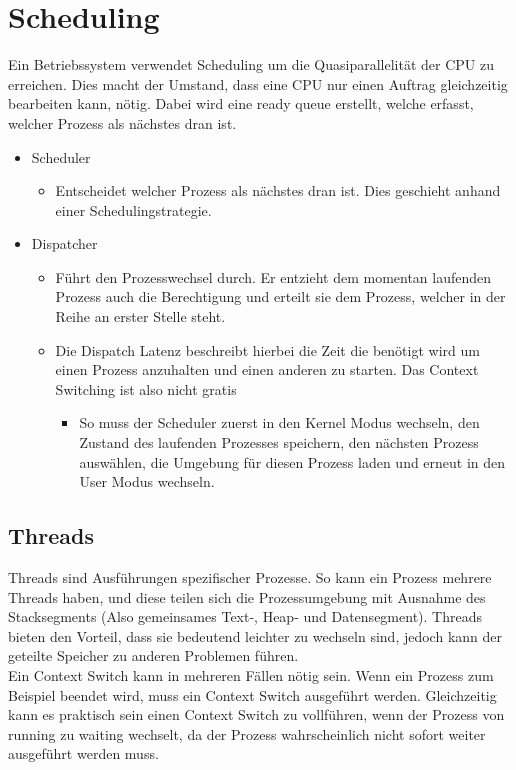 \documentclass{article}
\begin{document}
	\section{Scheduling}
	Ein Betriebssystem verwendet Scheduling um die Quasiparallelität der CPU zu erreichen. Dies macht der Umstand, dass eine CPU nur einen Auftrag gleichzeitig bearbeiten kann, nötig. Dabei wird eine ready queue erstellt, welche erfasst, welcher Prozess als nächstes dran ist. \\
	\begin{itemize}
		\item{Scheduler}
		\begin{itemize}
			\item{Entscheidet welcher Prozess als nächstes dran ist. Dies geschieht anhand einer Schedulingstrategie.}
		\end{itemize}
		\item{Dispatcher}
		\begin{itemize}
			\item{Führt den Prozesswechsel durch. Er entzieht dem momentan laufenden Prozess auch die Berechtigung und erteilt sie dem Prozess, welcher in der Reihe an erster Stelle steht.}
			\item{Die Dispatch Latenz beschreibt hierbei die Zeit die benötigt wird um einen Prozess anzuhalten und einen anderen zu starten. Das Context Switching ist also nicht gratis}
			\begin{itemize}
				\item{So muss der Scheduler zuerst in den Kernel Modus wechseln, den Zustand des laufenden Prozesses speichern, den nächsten Prozess auswählen, die Umgebung für diesen Prozess laden und erneut in den User Modus wechseln.}
			\end{itemize}
		\end{itemize}
	\end{itemize}
	\subsection{Threads}
	Threads sind Ausführungen spezifischer Prozesse. So kann ein Prozess mehrere Threads haben, und diese teilen sich die Prozessumgebung mit Ausnahme des Stacksegments (Also gemeinsames Text-, Heap- und Datensegment). Threads bieten den Vorteil, dass sie bedeutend leichter zu wechseln sind, jedoch kann der geteilte Speicher zu anderen Problemen führen. \\
	Ein Context Switch kann in mehreren Fällen nötig sein. Wenn ein Prozess zum Beispiel beendet wird, muss ein Context Switch ausgeführt werden. Gleichzeitig kann es praktisch sein einen Context Switch zu vollführen, wenn der Prozess von running zu waiting wechselt, da der Prozess wahrscheinlich nicht sofort weiter ausgeführt werden muss. \\
\end{document}
